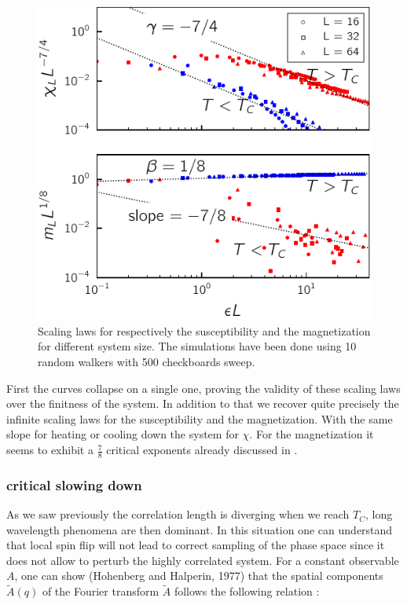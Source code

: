 \documentclass[ansiapaper]{report}
\begin{document}
\begin{multicols}{3}
\begin{figure}[H]
    \begin{center}
        \includegraphics[width=1\linewidth]{figures/2nd_order_scaling.pdf}
    \end{center}
    \caption{Scaling laws for respectively the susceptibility and the magnetization for different system size. The simulations have been done using 10 random walkers with 500 checkboards sweep.}\label{fig:2n-order-scaling}
\end{figure}

First the curves collapse on a single one, proving the validity of these scaling laws over the finitness of the system. In addition to that we recover quite precisely the infinite scaling laws for the susceptibility and the magnetization. With the same slope for heating or cooling down the system for $\chi$. For the magnetization it seems to exhibit a $\frac{7}{8}$ critical exponents already discussed in \cite{Landau}.

\subsubsection{critical slowing down}
As we saw previously the correlation length is diverging when we reach $T_C$, long wavelength phenomena are then dominant. In this situation one can understand that local spin flip will not lead to correct sampling of the phase space since it does not allow to perturb the highly correlated system. For a constant observable  $A$, one can show (Hohenberg and Halperin, 1977) that the spatial components $\tilde{A}(q)$ of the Fourier transform $\tilde{A}$ follows the following relation : 


\end{multicols}
\end{document}
